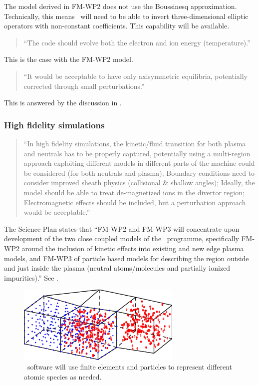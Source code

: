 The model derived in FM-WP2 does not use the Boussinesq approximation.
Technically, this means \nep\ will need to be able to invert three-dimensional
elliptic operators with non-constant coefficients.
This capability will be available.

\begin{quote}
``The code should evolve both the electron and ion energy (temperature).''
\end{quote}
This is the case with the FM-WP2 model.

\begin{quote}
``It would be acceptable to have only axisymmetric equilibria,
potentially corrected through small perturbations.''
\end{quote}
This is answered by the discussion in .


\subsubsection{High fidelity simulations}
\begin{quote}
``In high fidelity simulations, the kinetic/fluid transition for both plasma and
neutrals has to be properly captured, potentially using a multi-region approach
exploiting different models in different parts of the machine could be
considered (for both neutrals and plasma);
Boundary conditions need to consider improved sheath physics (collisional \&
shallow angles);
Ideally, the model should be able to treat de-magnetized ions in the divertor
region;
Electromagnetic effects should be included, but a perturbation approach would
be acceptable.''
\end{quote}

The Science Plan states that {\green ``FM-WP2 and FM-WP3 will concentrate upon
development of the two close coupled models of the \nep \  programme,
specifically FM-WP2 around the inclusion of kinetic effects into existing and
new edge plasma models, and FM-WP3 of particle based models for describing the
region outside and just inside the plasma (neutral atoms/molecules and
partially ionized impurities).''} See .

\begin{figure}
\centerline{\includegraphics[width=0.7\textwidth]{./png/colpri.png}}
\caption{
\nep \ software will use finite elements and particles to represent different atomic species
as needed.
\label{fig:colpri}}
\end{figure}

